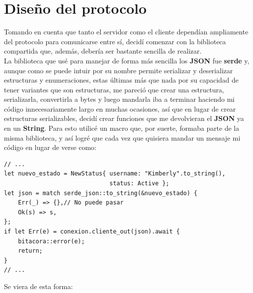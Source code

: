 \documentclass[11pt]{article}
\begin{document}
\section{Diseño del protocolo}

Tomando en cuenta que tanto el servidor como el cliente dependían ampliamente del protocolo para comunicarse entre sí, decidí comenzar con la biblioteca compartida que, además, debería ser bastante sencilla de realizar.\\
La biblioteca que usé para manejar de forma más sencilla los \textbf{JSON} fue \textbf{serde} y, aunque como se puede intuir por su nombre permite serializar y deserializar estructuras y enumeraciones, estas últimas más que nada por su capacidad de tener variantes que son estructuras, me pareció que crear una estructura, serializarla, convertirla a bytes y luego mandarla iba a terminar haciendo mi código innecesariamente largo en muchas ocasiones, así que en lugar de crear estructuras serializables, decidí crear funciones que me devolvieran el \textbf{JSON} ya en un \textbf{String}. Para esto utilicé un macro que, por suerte, formaba parte de la misma biblioteca, y así logré que cada vez que quisiera mandar un mensaje mi código en lugar de verse como:

\begin{verbatim}
// ...
let nuevo_estado = NewStatus{ username: "Kimberly".to_string(),
                              status: Active };
let json = match serde_json::to_string(&nuevo_estado) {
    Err(_) => {},// No puede pasar
    Ok(s) => s,
};
if let Err(e) = conexion.cliente_out(json).await {
    bitacora::error(e);
    return;
}
// ...
\end{verbatim}
Se viera de esta forma:
\end{document}
